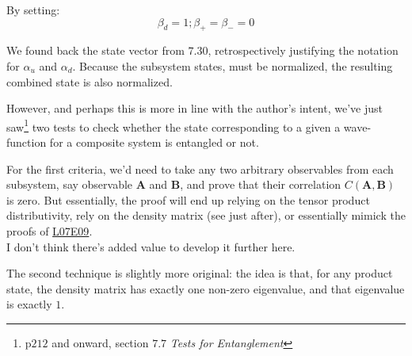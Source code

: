\documentclass[solutions.tex]{subfiles}
\begin{document}
By setting:
\[
	\beta_d = 1; \beta_+ = \beta_- = 0
\]

We found back the state vector from $7.30$, retrospectively justifying the
notation for $\alpha_u$ and $\alpha_d$. Because the subsystem states, must
be normalized, the resulting combined state is also normalized.

\hr

However, and perhaps this is more in line with the author's intent, we've
just saw\footnote{p$212$ and onward, section $7.7$ \textit{Tests for Entanglement}}
two tests to check whether the state corresponding to a given a wave-function
for a composite system is entangled or not. \\

\hrr

For the first criteria, we'd need to take any two arbitrary observables
from each subsystem, say observable $\bm{A}$ and $\bm{B}$, and prove that
their correlation $C(\bm{A}, \bm{B})$ is zero. But essentially, the proof
will end up relying on the tensor product distributivity, rely on the
density matrix (see just after), or essentially mimick the proofs of
\href{https://github.com/mbivert/ttm/blob/master/qm/L07E09.pdf}{L07E09}. \\

I don't think there's added value to develop it further here. \\

\hrr

The second technique is slightly more original: the idea is that, for any product
state, the density matrix has exactly one non-zero eigenvalue, and that
eigenvalue is exactly $1$. \\
\end{document}
